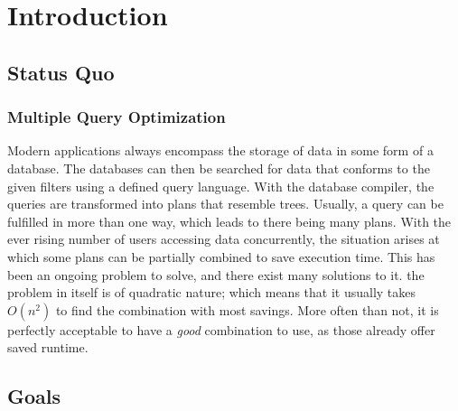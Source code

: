 \chapter{Introduction} %

\label{chapter:introduction} %


\newcommand{\keyword}[1]{\textbf{#1}}
\newcommand{\tabhead}[1]{\textbf{#1}}
\newcommand{\code}[1]{\texttt{#1}}
\newcommand{\file}[1]{\texttt{\bfseries#1}}
\newcommand{\option}[1]{\texttt{\itshape#1}}

\section{Status Quo}

\subsection{Multiple Query Optimization}
Modern applications always encompass the storage of data in some form of a database. The databases can then be searched for data that conforms to the given filters using a defined query language. With the database compiler, the queries are transformed into plans that resemble trees. Usually, a query can be fulfilled in more than one way, which leads to there being many plans. With the ever rising number of users accessing data concurrently, the situation arises at which some plans can be partially combined to save execution time. This has been an ongoing problem to solve, and there exist many solutions to it. the problem in itself is of quadratic nature; which means that it usually takes $O(n^2)$ to find the combination with most savings. More often than not, it is perfectly acceptable to have a \emph{good} combination to use, as those already offer saved runtime. 
\section{Goals}

